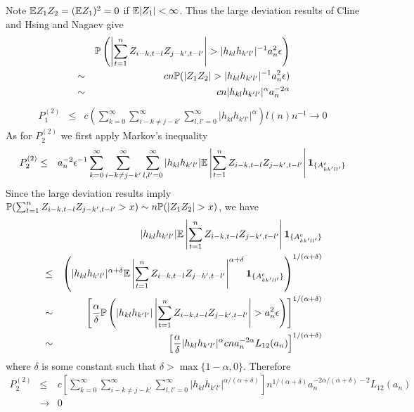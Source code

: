 \documentclass{article}
\begin{document}
Note $\E Z_1 Z_2 = (\E Z_1)^2 = 0$ if $\E|Z_1| < \infty$. Thus the
large deviation results of Cline and Hsing \cite{ClingHsing1998} and
Nagaev \cite{nagaev1979} give
\begin{eqnarray*}
  && \P\left(
    \left| \sum_{t=1}^n  Z_{i-k,t-l} Z_{j-k',t-l'}
    \right| > | h_{kl} h_{k'l'}|^{-1} a_n^2 \epsilon 
  \right) \\
  &\sim& c n \P(|Z_1 Z_2| > | h_{kl} h_{k'l'}|^{-1} a_n^2 \epsilon) \\
  &\sim& c n | h_{kl} h_{k'l'}|^{\alpha} a_n^{-2\alpha}
\end{eqnarray*}
\begin{eqnarray*}
  P^{(2)}_1 &\leq& c \left( \sum_{k=0}^\infty \sum_{i-k \neq j-k'}^\infty
  \sum_{l,l'=0}^\infty | h_{kl} h_{k'l'}|^{\alpha} \right) l(n) n^{-1}
\to 0
\end{eqnarray*}
As for $P^{(2)}_2$ we first apply Markov's inequality
\begin{eqnarray*}
  P^{(2)}_2 &\leq& a_n^{-2} \epsilon^{-1}
  \sum_{k=0}^\infty \sum_{i-k \neq j-k'}^\infty
  \sum_{l,l'=0}^\infty | h_{kl} h_{k'l'}| \E \left|
  \sum_{t=1}^n  Z_{i-k,t-l} Z_{j-k',t-l'} \right|
  \I{A^c_{kk'll'}}
\end{eqnarray*}
Since the large deviation results imply $\P(\sum_{t=1}^n  Z_{i-k,t-l}
Z_{j-k',t-l'} > x) \sim n \P(|Z_1 Z_2| > x)$, we have
\begin{eqnarray*}
  && | h_{kl} h_{k'l'}| \E \left| \sum_{t=1}^n  Z_{i-k,t-l} Z_{j-k',t-l'} \right|
  \I{A^c_{kk'll'}} \\
  &\leq& \left(
    | h_{kl} h_{k'l'}|^{\alpha + \delta} \E \left| \sum_{t=1}^n
      Z_{i-k,t-l} Z_{j-k',t-l'} \right|^{\alpha + \delta}
    \I{A^c_{kk'll'}} \right)^{1/(\alpha + \delta)} \\
    &\sim& \left[
      {\alpha \over \delta} \P\left(
      | h_{kl} h_{k'l'}| \left| \sum_{t=1}^n  Z_{i-k,t-l} Z_{j-k',t-l'}
      \right| > a_n^2 \epsilon \right) \right]^{1/(\alpha + \delta)} \\
  &\sim& \left[
    {\alpha \over \delta} | h_{kl} h_{k'l'}|^{\alpha}
    c n a_n^{-2\alpha} L_{12}(a_n)
    \right]^{1/(\alpha + \delta)}
\end{eqnarray*}
where $\delta$ is some constant such that $\delta > \max\{1-\alpha,
0\}$. Therefore
\begin{eqnarray*}
  P^{(2)}_2 &\leq& c  \left[\sum_{k=0}^\infty \sum_{i-k \neq j-k'}^\infty
  \sum_{l,l'=0}^\infty |h_{kl} h_{k'l'}|^{\alpha/(\alpha + \delta)}\right]
  n^{1/(\alpha + \delta)} a_n^{-2\alpha/(\alpha + \delta )-2} L_{12}(a_n)\\
  &\to&  0
\end{eqnarray*}
\end{document}

